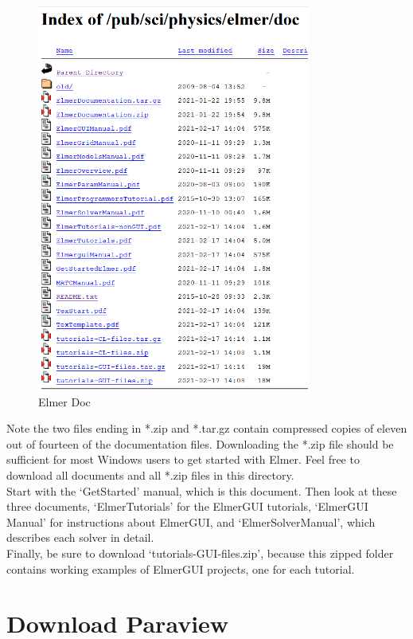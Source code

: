 \begin{figure}[H]
\centering
\includegraphics[width=0.8\textwidth]{elmer-doc}
\caption{Elmer Doc}\label{fg:elmer-doc}
\end{figure}

Note the two files ending in *.zip and *.tar.gz contain compressed copies of eleven out of fourteen of the documentation files.  Downloading the *.zip file should be sufficient for most Windows users to get started with Elmer.  Feel free to download all documents and all *.zip files in this directory.\\

Start with the `GetStarted' manual, which is this document.  Then look at these three documents, `ElmerTutorials' for the ElmerGUI tutorials, `ElmerGUI Manual' for instructions about ElmerGUI, and `ElmerSolverManual', which describes each solver in detail.  \\

Finally, be sure to download `tutorials-GUI-files.zip', because this zipped folder contains working examples of ElmerGUI projects, one for each tutorial.

\section{Download Paraview}


